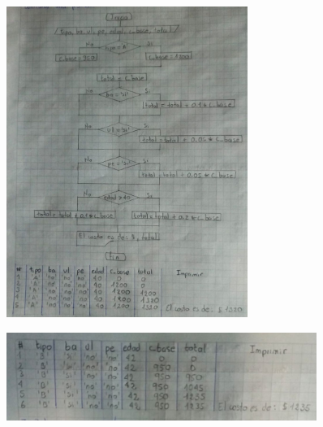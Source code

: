 \documentclass[12pt]{article}
\begin{document}
\begin{enumerate}
                \begin{figure}[!h]
                    \centering
                    \includegraphics[width=0.7\textwidth]{Img/DF_ej6_1.jpeg}
                \end{figure}

                \newpage
                \begin{figure}[!h]
                    \centering
                    \includegraphics[width=0.9\textwidth]{Img/DF_ej6_2.jpeg}
                \end{figure}


\end{enumerate}
\end{document}
